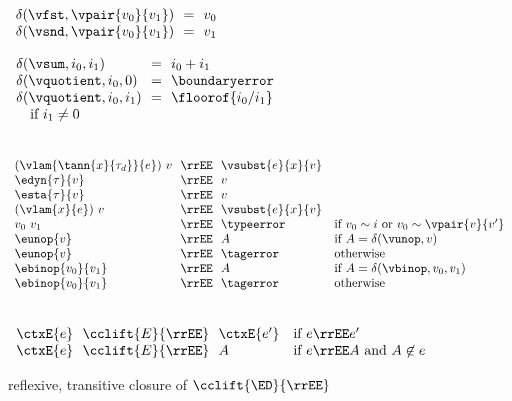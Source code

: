\begin{flushleft}
\medskip
\begin{minipage}[t]{0.38\columnwidth}
$\begin{array}{l@{~~}c@{~~}l}
  \delta(\vfst, \vpair{v_0}{v_1}) & = & v_0
\\
  \delta(\vsnd, \vpair{v_0}{v_1}) & = & v_1
\end{array}$
\end{minipage}%
\begin{minipage}[t]{0.5\columnwidth}
$\begin{array}{l@{~~}c@{~~}l}
  \delta(\vsum, i_0, i_1) & = & i_0 + i_1
\\
  \delta(\vquotient, i_0, 0) & = & \boundaryerror
\\
  \delta(\vquotient, i_0, i_1) & = & \floorof{i_0 / i_1}
\\ \multicolumn{3}{l}{\mbox{\quad if $i_1 \neq 0$}}
\end{array}$
\end{minipage}

\medskip
{}\\
$\begin{array}{l@{~~}c@{~~}l l}
  (\vlam{\tann{x}{\tau_d}}{e})~v & \rrEE & \vsubst{e}{x}{v} &
\\
  \edyn{\tau}{v} & \rrEE & v &
\\
  \esta{\tau}{v} & \rrEE & v &
\\
  (\vlam{x}{e})~v & \rrEE & \vsubst{e}{x}{v} &
\\
  v_0~v_1 & \rrEE & \typeerror & \mbox{if $v_0 \sim i$ or $v_0 \sim \vpair{v}{v'}$}
\\
  \eunop{v} & \rrEE & A & \mbox{if $A = \delta(\vunop, v)$}
\\
  \eunop{v} & \rrEE & \tagerror & \mbox{otherwise}
\\
  \ebinop{v_0}{v_1} & \rrEE & A & \mbox{if $A = \delta(\vbinop, v_0, v_1)$}
\\
  \ebinop{v_0}{v_1} & \rrEE & \tagerror & \mbox{otherwise}
\end{array}$

\medskip
{}\\
$\begin{array}{l@{~~}c@{~~}l l}
\ctxE{e} & \cclift{E}{\rrEE} & \ctxE{e'} & \mbox{if $e \rrEE e'$}
\\
\ctxE{e} & \cclift{E}{\rrEE} & A         & \mbox{if $e \rrEE A$ and $A \not\in e$}
\end{array}$

\smallskip
{} reflexive, transitive closure of $\cclift{\ED}{\rrEE}$


\end{flushleft}
